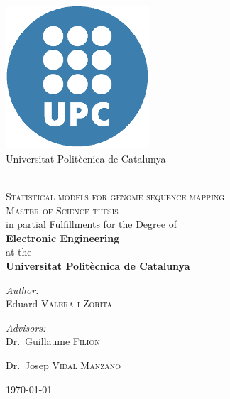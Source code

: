 \documentclass[letterpaper,twoside,11pt]{report}
\begin{document}
{}
\begin{titlepage}
\begin{center}
\mbox{ }\\[2cm]
\begin{minipage}{0.4\textwidth}
	\centering
	\includegraphics[width=0.4\textwidth]{figures/logo_upc}\\
	Universitat Polit\`{e}cnica de Catalunya
\end{minipage}\\[2cm]
\textsc{\LARGE Statistical models for genome sequence mapping}\\[1.5cm]
\textsc{\Large Master of Science thesis}\\[2cm]
{\Large in partial Fulfillments for the Degree of}\\
{ \Large \bfseries Electronic Engineering}\\[1cm]
{\Large at the}\\
{ \Large \bfseries Universitat Polit\`{e}cnica de Catalunya}\\[3cm]
\begin{minipage}{0.4\textwidth}
\begin{flushleft} \large
\emph{Author:}\\
Eduard \textsc{Valera i Zorita}
\end{flushleft}
\end{minipage}
\begin{minipage}{0.4\textwidth}
\begin{flushright} \large
\emph{Advisors:} \\
Dr.~Guillaume \textsc{Filion}

Dr.~Josep \textsc{Vidal Manzano}
\end{flushright}
\end{minipage}
\vfill
{\large \today}
\end{center}
\end{titlepage}
\end{document}

